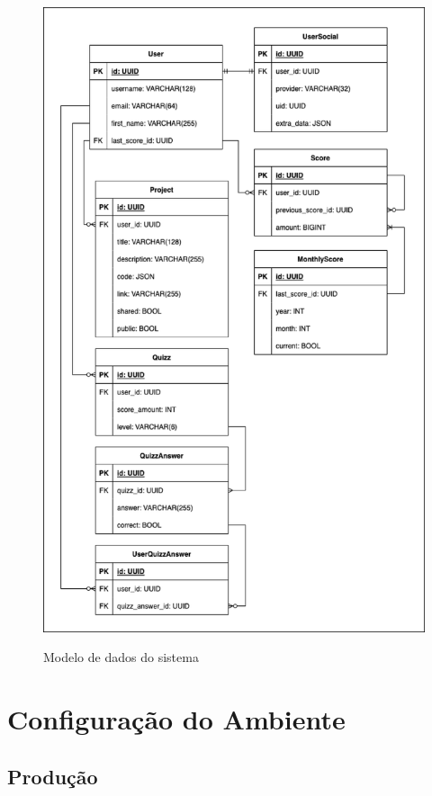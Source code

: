 \begin{figure}[H]
    \centering
    \caption{Modelo de dados do sistema}
    \includegraphics[keepaspectratio=true,scale=0.5]{figuras/modelo_de_dados.eps}
    \label{fig:modelo_dados}
\end{figure}


\section{Configuração do Ambiente}

\subsection{Produção}


